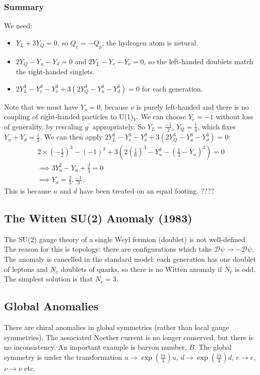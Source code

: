 \subsubsection{Summary}
We need:
\begin{itemize}
\item $Y_L + 3 Y_Q = 0$, so $Q_e = -Q_p$; the hydrogen atom is netural.
\item $2Y_Q - Y_u - Y_d = 0$ and $2Y_L - Y_e - Y_\nu=0$, so the left-handed doublets match the right-handed singlets.
\item $2Y_L^3 - Y_e^3 - Y_\nu^3 + 3(2Y_Q^3 - Y_u^3 - Y_d^3) = 0$ for each generation.
\end{itemize}
Note that we must have $Y_\nu=0$, because $\nu$ is purely left-handed and there is no coupling of right-handed particles to U(1)$_Y$. We can choose $Y_e =-1$ without loss of generality, by rescaling $g^\prime$ appropriately. So $Y_L = \frac{-1}{2}$, $Y_Q=\frac{1}{6}$, which fixes $Y_u + Y_d = \frac{1}{3}$.  We can then apply $2Y_L^3 - Y_e^3 - Y_\nu^3 + 3(2Y_Q^3 - Y_u^3 - Y_d^3) = 0$:
\begin{equation}
\begin{split}
2\times(-\frac{1}{2})^3 - (-1)^3 + 3(2(\frac{1}{6})^3 - Y_u^3 - (\frac{1}{3} - Y_u)^3) = 0 \\
\implies 3Y_u^2 - Y_u + \frac{2}{3} = 0 \\
\implies Y_u = \frac{2}{3}, \frac{-1}{3}.
\end{split}
\end{equation} 
This is because $u$ and $d$ have been treated on an equal footing. ????
%
\subsection{The Witten SU(2) Anomaly (1983)}
%
The SU(2) gauge theory of a single Weyl fermion (doublet) is not well-defined. The reason for this is topology: there are configurations which take $\mathcal{D} \psi \to - \mathcal{D} \psi $. The anomaly is cancelled in the standard model: each generation has one doublet of leptons and $N_c$ doublets of quarks, so there is no Witten anomaly if $N_c$ is odd. The simplest solution is that $N_c=3$.
%
\subsection{Global Anomalies}
%
There are chiral anomalies in global symmetries (rather than local gauge symmetries). The associated Noether current is no longer conserved, but there is no inconsistency. An important example is baryon number, $B$. The global symmetry is under the transformation $u \to \exp(\frac{i\alpha}{3})u$, $d \to \exp(\frac{i\alpha}{3})d$, $e \to e$, $\nu \to \nu$ etc.

